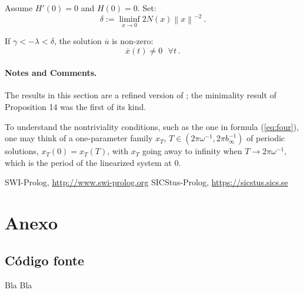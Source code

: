 \documentclass{llncs}
\begin{document}
\begin{proposition}
Assume $H'(0)=0$ and $ H(0)=0$. Set:
\begin{equation}
  \delta := \liminf_{x\to 0} 2 N (x) \left\|x\right\|^{-2}\ .
  \label{eq:one}
\end{equation}

If $\gamma < - \lambda < \delta$,
the solution $\overline{u}$ is non-zero:
\begin{equation}
  \overline{x} (t) \ne 0\ \ \ \forall t\ .
\end{equation}
\end{proposition}


\paragraph{Notes and Comments.}
The results in this section are a
refined version of \cite{clar:eke};
the minimality result of Proposition
14 was the first of its kind.

To understand the nontriviality conditions, such as the one in formula
(\ref{eq:four}), one may think of a one-parameter family
$x_{T}$, $T\in \left(2\pi\omega^{-1}, 2\pi b_{\infty}^{-1}\right)$
of periodic solutions, $x_{T} (0) = x_{T} (T)$,
with $x_{T}$ going away to infinity when $T\to 2\pi \omega^{-1}$,
which is the period of the linearized system at 0.

%
%
\begin{thebibliography}{5}
%
SWI-Prolog,
\url{http://www.swi-prolog.org}
SICStus-Prolog,
\url{https://sicstus.sics.se}


\end{thebibliography}
\clearpage

\section*{Anexo}
\subsection*{Código fonte}

Bla Bla
\end{document}
